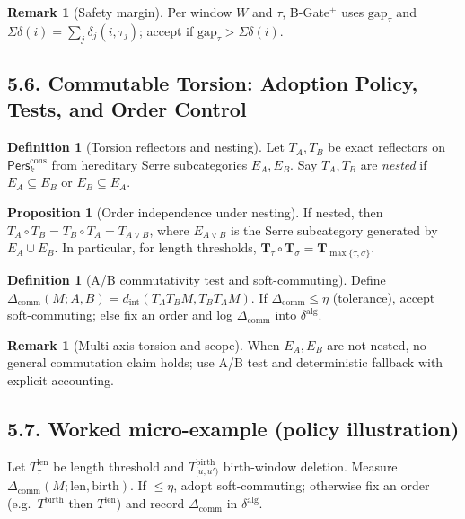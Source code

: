\documentclass[11pt]{article}
\numberwithin{equation}{section}
\theoremstyle{plain}
\theoremstyle{definition}
\theoremstyle{remark}
\DeclareRobustCommand{\hyp}{\nobreakdash-}
\theoremstyle{plain}
\theoremstyle{definition}
\numberwithin{equation}{section}
\newtheorem{proposition}[theorem]{Proposition}
\theoremstyle{definition}
\newtheorem{definition}[theorem]{Definition}
\newtheorem{remark}[theorem]{Remark}
\numberwithin{equation}{section}
\theoremstyle{plain}
\theoremstyle{definition}
\theoremstyle{remark}
\begin{document}
\begin{remark}[Safety margin]
Per window $W$ and $\tau$, B-Gate$^{+}$ uses $\mathrm{gap}_\tau$ and $\Sigma\delta(i)=\sum_j\delta_j(i,\tau_j)$; accept if $\mathrm{gap}_\tau>\Sigma\delta(i)$.
\end{remark}

\subsection*{5.6. Commutable Torsion: Adoption Policy, Tests, and Order Control}

\begin{definition}[Torsion reflectors and nesting]\label{def:torsion-reflectors}
Let $T_A,T_B$ be exact reflectors on $\mathsf{Pers}^{\mathrm{cons}}_k$ from hereditary Serre subcategories $E_A,E_B$. Say $T_A,T_B$ are \emph{nested} if $E_A\subseteq E_B$ or $E_B\subseteq E_A$.
\end{definition}

\begin{proposition}[Order independence under nesting]\label{prop:nested-commute}
If nested, then $T_A\circ T_B=T_B\circ T_A=T_{A\vee B}$, where $E_{A\vee B}$ is the Serre subcategory generated by $E_A\cup E_B$. In particular, for length thresholds, $\mathbf{T}_\tau\circ \mathbf{T}_\sigma=\mathbf{T}_{\max\{\tau,\sigma\}}$.
\end{proposition}

\begin{definition}[A/B commutativity test and soft\hyp commuting]\label{def:soft-commute}
Define $\Delta_{\mathrm{comm}}(M;A,B)=d_{\mathrm{int}}(T_AT_BM,T_BT_AM)$. If $\Delta_{\mathrm{comm}}\le\eta$ (tolerance), accept soft\hyp commuting; else fix an order and log $\Delta_{\mathrm{comm}}$ into $\delta^{\mathrm{alg}}$.
\end{definition}

\begin{remark}[Multi\hyp axis torsion and scope]
When $E_A,E_B$ are not nested, no general commutation claim holds; use A/B test and deterministic fallback with explicit accounting.
\end{remark}

\subsection*{5.7. Worked micro\hyp example (policy illustration)}
Let $T^{\mathrm{len}}_\tau$ be length threshold and $T^{\mathrm{birth}}_{[u,u')}$ birth-window deletion. Measure $\Delta_{\mathrm{comm}}(M;\mathrm{len},\mathrm{birth})$. If $\le\eta$, adopt soft\hyp commuting; otherwise fix an order (e.g.\ $T^{\mathrm{birth}}$ then $T^{\mathrm{len}}$) and record $\Delta_{\mathrm{comm}}$ in $\delta^{\mathrm{alg}}$.
\end{document}
